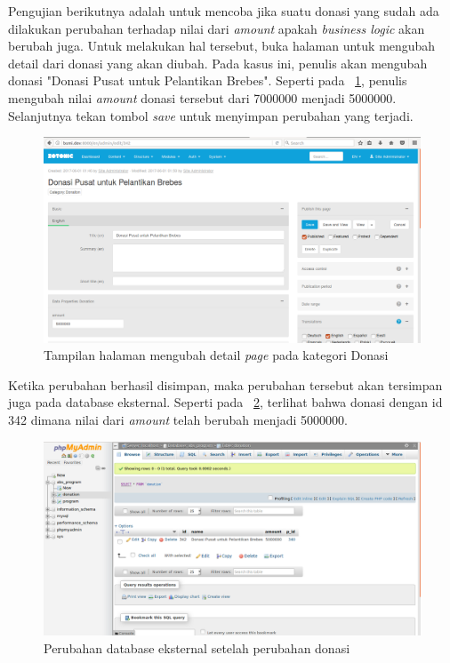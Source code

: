 Pengujian berikutnya adalah untuk mencoba jika suatu donasi yang sudah ada dilakukan perubahan terhadap nilai dari \textit{amount} apakah \textit{business logic} akan berubah juga. Untuk melakukan hal tersebut, buka halaman untuk mengubah detail dari donasi yang akan diubah. Pada kasus ini, penulis akan mengubah donasi "Donasi Pusat untuk Pelantikan Brebes". Seperti pada \pic~\ref{fig:updatedonation}, penulis mengubah nilai \textit{amount} donasi tersebut dari 7000000 menjadi 5000000. Selanjutnya tekan tombol \textit{save} untuk menyimpan perubahan yang terjadi.
\begin{figure}
	\centering
	\includegraphics[width=1\textwidth]
	{pics/28-updateDonation.png}
	\caption{Tampilan halaman mengubah detail \textit{page} pada kategori Donasi}
	\label{fig:updatedonation}
\end{figure}
\vspace{-0.3cm}

Ketika perubahan berhasil disimpan, maka perubahan tersebut akan tersimpan juga pada database eksternal. Seperti pada \pic~\ref{fig:dbupdatedonation}, terlihat bahwa donasi dengan id 342 dimana nilai dari \textit{amount} telah berubah menjadi 5000000.
\begin{figure}
	\centering
	\includegraphics[width=1\textwidth]
	{pics/29-dbupdatedonation.png}
	\caption{Perubahan database eksternal setelah perubahan donasi}
	\label{fig:dbupdatedonation}
\end{figure}
\vspace{-0.3cm}

